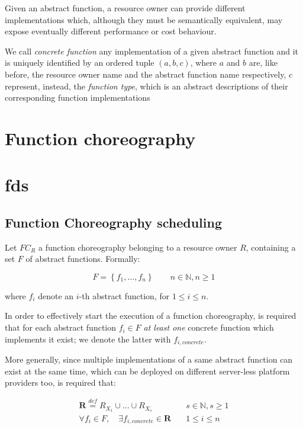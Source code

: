 \documentclass[10pt,a4paper]{article}
\newcommand{\mathDef}{\overset{\textit{def}}{=}}
\begin{document}
Given an abstract function, a resource owner can provide different implementations which, although they must be semantically equivalent, may expose eventually different performance or cost behaviour.

We call \textit{concrete function} any implementation of a given abstract function and it is uniquely identified by an ordered tuple $(a, b, c)$, where $a$ and $b$ are, like before, the resource owner name and the abstract function name respectively, $c$ represent, instead, the \textit{function type}, which is an abstract descriptions of their corresponding function implementations

\section{Function choreography}


\section{fds}











\subsection{Function Choreography scheduling}

Let $FC_R$ a function choreography belonging to a resource owner $R$, containing a set $F$ of abstract functions. Formally:

\begin{equation}
F =  \left\{ f_1, \ldots, f_n \right\} \qquad n \in \mathbb{N}, n \geq 1 
\end{equation}

where $f_i$ denote an $i$-th abstract function, for $1 \leq i \leq n$.

In order to effectively start the execution of a function choreography, is required that for each abstract function $f_i \in F$ \textit{at least one} concrete function which implements it exist; we denote the latter with $f_{i, concrete}$.

More generally, since multiple implementations of a same abstract function can exist at the same time, which can be deployed on different server-less platform providers too, is required that:

\begin{equation}
\begin{array}{lc}
\textbf{R} \mathDef R_{{X}_{1}} \cup  \ldots \cup R_{{X}_{s}} & \quad s \in \mathbb{N}, s \geq 1  \\

\forall f_i \in F, \quad \exists f_{i, concrete} \in \textbf{R} & \quad 1 \leq i \leq n 

\end{array}
\end{equation}
\end{document}
